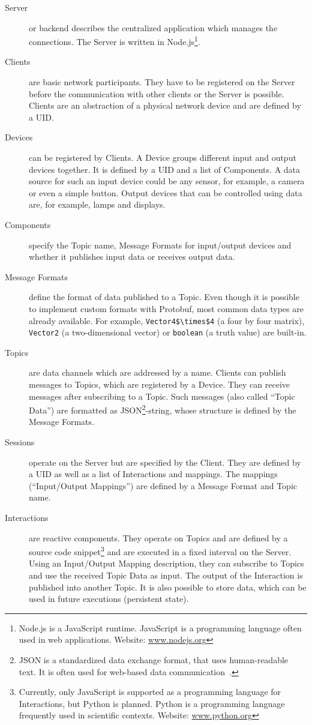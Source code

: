 \begin{description}
	\item[Server] or backend describes the centralized application which manages the connections. The Server is written in Node.js\footnote{Node.js is a JavaScript runtime. JavaScript is a programming language often used in web applications. Website: \href{https://nodejs.org/}{www.nodejs.org}}.
	\item[Clients] are basic network participants. They have to be registered on the Server before the communication with other clients or the Server is possible. Clients are an abstraction of a physical network device and are defined by a \gls{UID}.
	\item[Devices] can be registered by Clients. A Device groups different input and output devices together. It is defined by a \gls{UID} and a list of Components. A data source for such an input device could be any sensor, for example, a camera or even a simple button. Output devices that can be controlled using data are, for example, lamps and displays.
	\item[Components] specify the Topic name, Message Formats for input/output devices and whether it publishes input data or receives output data. 
	\item[Message Formats] define the format of data published to a Topic. Even though it is possible to implement custom formats with \gls{Protobuf}, most common data types are already available. For example, \lstinline[mathescape=true]{Vector4$\times$4} (a four by four matrix), \lstinline{Vector2} (a two-dimensional vector) or \lstinline{boolean} (a truth value) are built-in. %
	\item[Topics] are data channels which are addressed by a name. Clients can publish messages to Topics, which are registered by a Device. They can receive messages after subscribing to a Topic. Such messages (also called \enquote{Topic Data}) are formatted as JSON\footnote{JSON is a standardized data exchange format, that uses human-readable text. It is often used for web-based data communication~\cite[iii]{ECMAInternational.2017}.}-string, whose structure is defined by the Message Formats.
	\item[Sessions] operate on the Server but are specified by the Client. They are defined by a \gls{UID} as well as a list of Interactions and mappings. The mappings (\enquote{Input/Output Mappings}) are defined by a Message Format and Topic name.
	\item[Interactions] are reactive components. They operate on Topics and are defined by a source code snippet\footnote{Currently, only JavaScript is supported as a programming language for Interactions, but Python is planned. Python is a programming language frequently used in scientific contexts. Website: \href{https://www.python.org/}{www.python.org}} and are executed in a fixed interval on the Server. Using an Input/Output Mapping description, they can subscribe to Topics and use the received Topic Data as input. The output of the Interaction is published into another Topic. It is also possible to store data, which can be used in future executions (persistent state).

\end{description}

